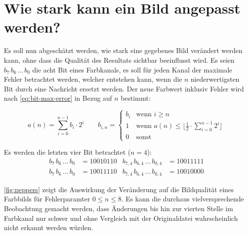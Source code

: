 \section{Wie stark kann ein Bild angepasst werden?}
Es soll nun abgeschätzt werden, wie stark eine gegebenes Bild verändert
werden kann, ohne dass die Qualität des Resultats sichtbar beeinflusst
wird. Es seien $b_7\,b_6\, \ldots \,b_0$ die acht Bit eines Farbkanals, es soll für
jeden Kanal der maximale Fehler betrachtet werden, welcher entstehen kann,
wenn die $n$ niederwertigsten Bit durch eine Nachricht ersetzt werden.
Der neue Farbwert inklusiv Fehler wird nach \eqref{eq:bit-max-error} in Bezug auf $n$ bestimmt:

\begin{equation}
  a(n) = \sum_{i=0}^{n - 1} b_i \cdot 2^i \qquad
  b_{i, n} =
  \begin{cases}
    b_i & \text{wenn $i \geq n$}                                                           \\
    1   & \text{wenn $a(n) \leq \lfloor \frac{1}{2} \cdot \sum_{i=0}^{n - 1} 2^i$} \rfloor \\
    0   & \text{sonst}
  \end{cases}
  \label{eq:bit-max-error}
\end{equation}

\begin{example}
  Es werden die letzten vier Bit betrachtet ($n = 4$):
  \begin{align*}
    b_7\,b_6\, \ldots \, b_0 & = 10010110 & b_{7,4}\,b_{6,4}\, \ldots \, b_{0,4} & = 10011111 \\
    b_7\,b_6\, \ldots \, b_0 & = 10011110 & b_{7,4}\,b_{6,4}\, \ldots \, b_{0,4} & = 10010000
  \end{align*}
\end{example}

\noindent
\autoref{fig:peppers} zeigt die Auswirkung der Veränderung auf die Bildqualität
eines Farbbilds für Fehlerparamter $0 \leq n \leq 8$.
Es kann die durchaus vielversprechende Beobachtung
gemacht werden, dass Änderungen bis hin zur vierten Stelle im Farbkanal nur schwer und
ohne Vergleich mit der Originaldatei wahrscheinlich nicht erkannt werden würden.

